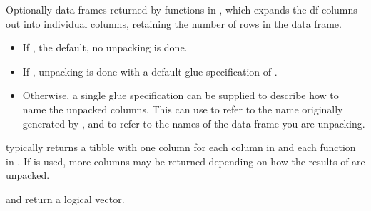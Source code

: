 \documentclass[a4paper]{book}
\begin{document}
\begin{Arguments}
\begin{ldescription}
\item[\code{.unpack}] \strong{[Experimental]}

Optionally  data frames returned by functions in
, which expands the df-columns out into individual columns, retaining
the number of rows in the data frame.
\begin{itemize}

\item{} If , the default, no unpacking is done.
\item{} If , unpacking is done with a default glue specification of
.
\item{} Otherwise, a single glue specification can be supplied to describe how to
name the unpacked columns. This can use  to refer to the name
originally generated by , and  to refer to the names of
the data frame you are unpacking.

\end{itemize}

\end{ldescription}
\end{Arguments}
%
\begin{Value}
 typically returns a tibble with one column for each column in
 and each function in . If  is used, more columns may
be returned depending on how the results of  are unpacked.

 and  return a logical vector.
\end{Value}
%
\end{document}
